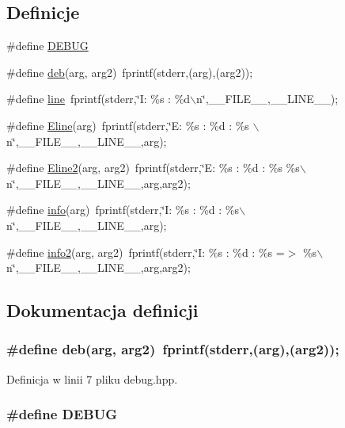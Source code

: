 \subsection*{Definicje}
\begin{CompactItemize}
\item 
\#define \hyperlink{a00005_d72dbcf6d0153db1b8d8a58001feed83}{DEBUG}
\item 
\#define \hyperlink{a00005_21ad5938437ed6d1865dd14c8d1871bc}{deb}(arg, arg2)~fprintf(stderr,(arg),(arg2));
\item 
\#define \hyperlink{a00005_5bdec07ba0f5f220bcb40d5258725d95}{line}~fprintf(stderr,\char`\"{}I: \%s : \%d$\backslash$n\char`\"{},\_\-\_\-FILE\_\-\_\-,\_\-\_\-LINE\_\-\_\-);
\item 
\#define \hyperlink{a00005_b3fdd01cf4ecc9316aa5051f88e36af2}{Eline}(arg)~fprintf(stderr,\char`\"{}E: \%s : \%d : \%s $\backslash$n\char`\"{},\_\-\_\-FILE\_\-\_\-,\_\-\_\-LINE\_\-\_\-,arg);
\item 
\#define \hyperlink{a00005_66e7745144eb47a4111a0c2b5f66d6ac}{Eline2}(arg, arg2)~fprintf(stderr,\char`\"{}E: \%s : \%d : \%s \%s$\backslash$n\char`\"{},\_\-\_\-FILE\_\-\_\-,\_\-\_\-LINE\_\-\_\-,arg,arg2);
\item 
\#define \hyperlink{a00005_590af51ecfed28223c4e6ce02994241a}{info}(arg)~fprintf(stderr,\char`\"{}I: \%s : \%d : \%s$\backslash$n\char`\"{},\_\-\_\-FILE\_\-\_\-,\_\-\_\-LINE\_\-\_\-,arg);
\item 
\#define \hyperlink{a00005_51633d6d15647d74f756bcf969fc70ae}{info2}(arg, arg2)~fprintf(stderr,\char`\"{}I: \%s : \%d : \%s =$>$ \%s$\backslash$n\char`\"{},\_\-\_\-FILE\_\-\_\-,\_\-\_\-LINE\_\-\_\-,arg,arg2);
\end{CompactItemize}


\subsection{Dokumentacja definicji}
\hypertarget{a00005_21ad5938437ed6d1865dd14c8d1871bc}{
\subsubsection[{deb}]{\setlength{\rightskip}{0pt plus 5cm}\#define deb(arg, \/  arg2)~fprintf(stderr,(arg),(arg2));}}
\label{a00005_21ad5938437ed6d1865dd14c8d1871bc}




Definicja w linii 7 pliku debug.hpp.\hypertarget{a00005_d72dbcf6d0153db1b8d8a58001feed83}{
\subsubsection[{DEBUG}]{\setlength{\rightskip}{0pt plus 5cm}\#define DEBUG}}
\label{a00005_d72dbcf6d0153db1b8d8a58001feed83}




